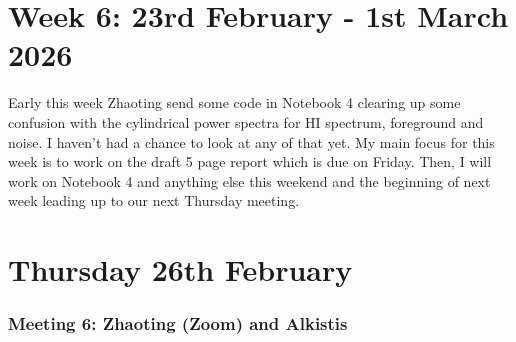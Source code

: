 \section{Week 6: 23rd February - 1st March 2026}

Early this week Zhaoting send some code in Notebook 4 clearing up some confusion with the cylindrical power spectra for HI spectrum, foreground and noise. I haven't had a chance to look at any of that yet. My main focus for this week is to work on the draft 5 page report which is due on Friday. Then, I will work on Notebook 4 and anything else this weekend and the beginning of next week leading up to our next Thursday meeting.

\section{Thursday 26th February}

\subsubsection{Meeting 6: Zhaoting (Zoom) and Alkistis}

